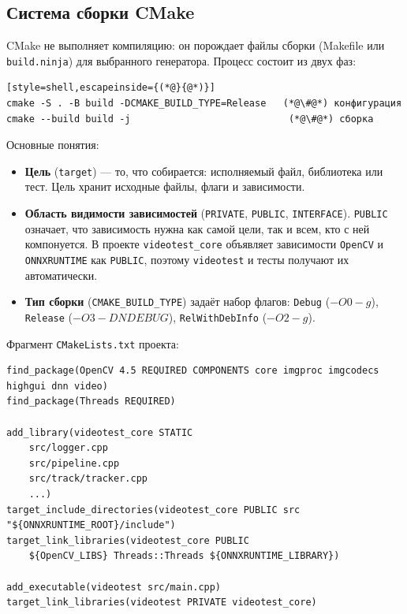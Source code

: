 \documentclass[11pt,a4paper]{article}
\theoremstyle{definition}
\theoremstyle{remark}
\begin{document}
\subsection{Система сборки CMake}

CMake не выполняет компиляцию: он порождает файлы сборки (Makefile или
\texttt{build.ninja}) для выбранного генератора. Процесс состоит из двух фаз:

\begin{lstlisting}[style=shell,escapeinside={(*@}{@*)}]
cmake -S . -B build -DCMAKE_BUILD_TYPE=Release   (*@\#@*) конфигурация
cmake --build build -j                            (*@\#@*) сборка
\end{lstlisting}

Основные понятия:

\begin{itemize}
  \item \textbf{Цель} (\texttt{target}) --- то, что собирается: исполняемый
        файл, библиотека или тест. Цель хранит исходные файлы, флаги и
        зависимости.
  \item \textbf{Область видимости зависимостей}
        (\texttt{PRIVATE}, \texttt{PUBLIC}, \texttt{INTERFACE}).
        \texttt{PUBLIC} означает, что зависимость нужна как самой цели, так и
        всем, кто с ней компонуется. В проекте \texttt{videotest\_core}
        объявляет зависимости \texttt{OpenCV} и \texttt{ONNXRUNTIME} как
        \texttt{PUBLIC}, поэтому \texttt{videotest} и тесты получают их
        автоматически.
  \item \textbf{Тип сборки} (\texttt{CMAKE\_BUILD\_TYPE}) задаёт набор флагов:
        \texttt{Debug} ($-O0 -g$), \texttt{Release} ($-O3 -DNDEBUG$),
        \texttt{RelWithDebInfo} ($-O2 -g$).
\end{itemize}

Фрагмент \texttt{CMakeLists.txt} проекта:

\begin{lstlisting}[style=cmake]
find_package(OpenCV 4.5 REQUIRED COMPONENTS core imgproc imgcodecs highgui dnn video)
find_package(Threads REQUIRED)

add_library(videotest_core STATIC
    src/logger.cpp
    src/pipeline.cpp
    src/track/tracker.cpp
    ...)
target_include_directories(videotest_core PUBLIC src "${ONNXRUNTIME_ROOT}/include")
target_link_libraries(videotest_core PUBLIC
    ${OpenCV_LIBS} Threads::Threads ${ONNXRUNTIME_LIBRARY})

add_executable(videotest src/main.cpp)
target_link_libraries(videotest PRIVATE videotest_core)
\end{lstlisting}
\end{document}
